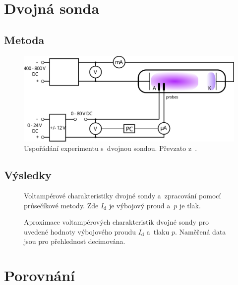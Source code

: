 \documentclass{protokol}
\newcommand\pres{p}
\newcommand\idisch{I_\mathrm{d}}
\begin{document}
\clearpage
\section{Dvojná sonda}
\label{sec:double}

\subsection{Metoda}
\label{sec:method-double}

\begin{figure}[hbp]
	\centering
	\includegraphics{diagram-double.png}
	\caption{Uspořádání experimentu s~dvojnou sondou.
		Převzato z~\autocite{assignment-doubleprobe}.}
	\label{fig:diagram-double}
\end{figure}

\subsection{Výsledky}
\label{sec:results-double}

\begin{figure}
	\centering
	
	
	\par\smallskip
	
	
	\caption{Voltampérové charakteristiky dvojné sondy
		a~zpracování pomocí průsečíkové metody.
		Zde $\idisch$ je výbojový proud a~$\pres$ je tlak.}
	\label{fig:double-vac}
\end{figure}

\begin{figure}
	\centering
	
	\caption{Aproximace voltampérových charakteristik dvojné sondy
		pro uvedené hodnoty výbojového proudu $\idisch$ a~tlaku $\pres$.
		Naměřená data jsou pro přehlednost decimována.}
	\label{fig:double-fit}
\end{figure}

\section{Porovnání}
\label{sec:comparison}
\end{document}
